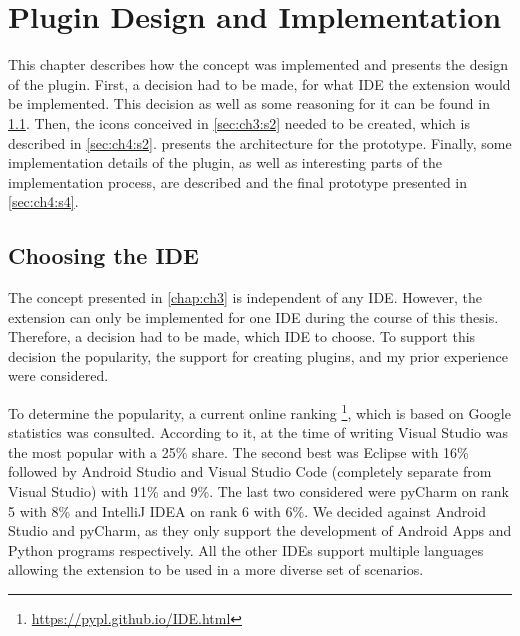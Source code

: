 
\chapter{Plugin Design and Implementation}
\label{chap:ch4}
This chapter describes how the concept was implemented and presents the design of the plugin.
First, a decision had to be made, for what \gls{IDE} the extension would be implemented.
This decision as well as some reasoning for it can be found in \cref{sec:ch4:s1}.
Then, the icons conceived in \cref{sec:ch3:s2} needed to be created, which is described in \cref{sec:ch4:s2}.
 presents the architecture for the prototype.
Finally, some implementation details of the plugin, as well as interesting parts of the implementation process, are described 
and the final prototype presented in \cref{sec:ch4:s4}.

\section{Choosing the IDE}
\label{sec:ch4:s1}
The concept presented in \cref{chap:ch3} is independent of any \gls{IDE}.
However, the extension can only be implemented for one \gls{IDE} during the course of this thesis.
Therefore, a decision had to be made, which \gls{IDE} to choose.
To support this decision the popularity, the support for creating plugins, and my prior experience were considered.

To determine the popularity, a current online ranking \footnote{\url{https://pypl.github.io/IDE.html}}, which is based on Google statistics was consulted.
According to it, at the time of writing Visual Studio was the most popular with a 25\% share.
The second best was \gls{Eclipse} with 16\% followed by Android Studio and Visual Studio Code (completely separate from Visual Studio) with 11\% and 9\%.
The last two considered were pyCharm on rank 5 with 8\% and IntelliJ IDEA on rank 6 with 6\%.
We decided against Android Studio and pyCharm, as they only support the development of Android Apps and Python programs respectively.
All the other \glspl{IDE} support multiple languages allowing the extension to be used in a more diverse set of scenarios.

